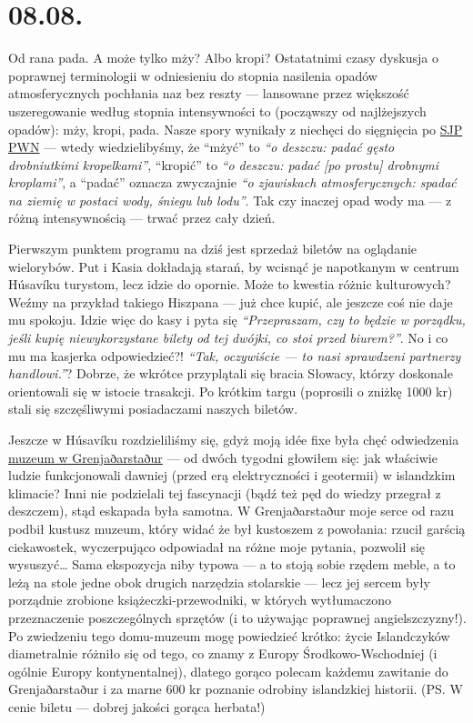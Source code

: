 \chapter*{08.08.}

Od rana pada. A może tylko mży? Albo kropi? Ostatatnimi czasy dyskusja o poprawnej terminologii w odniesieniu do stopnia nasilenia opadów atmosferycznych pochłania naz bez reszty --- lansowane przez większość uszeregowanie według stopnia intensywności to (począwszy od najlżejszych opadów): mży, kropi, pada. Nasze spory wynikały z niechęci do sięgnięcia po \href{http://sjp.pwn.pl/}{SJP PWN} --- wtedy wiedzielibyśmy, że “mżyć” to \emph{“o deszczu: padać gęsto drobniutkimi kropelkami”}, “kropić” to \emph{“o deszczu: padać [po prostu] drobnymi kroplami”}, a “padać” oznacza zwyczajnie \emph{“o zjawiskach atmosferycznych: spadać na ziemię w postaci wody, śniegu lub lodu”}. Tak czy inaczej opad wody ma --- z różną intensywnością --- trwać przez cały dzień.

Pierwszym punktem programu na dziś jest sprzedaż biletów na oglądanie wielorybów. Put i Kasia dokładają starań, by wcisnąć je napotkanym w centrum Húsavíku turystom, lecz idzie do opornie. Może to kwestia różnic kulturowych? Weźmy na przykład takiego Hiszpana --- już chce kupić, ale jeszcze coś nie daje mu spokoju. Idzie więc do kasy i pyta się \emph{“Przepraszam, czy to będzie w porządku, jeśli kupię niewykorzystane bilety od tej dwójki, co stoi przed biurem?”}. No i co mu ma kasjerka odpowiedzieć?! \emph{“Tak, oczywiście --- to nasi sprawdzeni partnerzy handlowi.”}? Dobrze, że wkrótce przyplątali się bracia Słowacy, którzy doskonale orientowali się w istocie trasakcji. Po krótkim targu (poprosili o zniżkę 1000 kr) stali się szczęśliwymi posiadaczami naszych biletów.


Jeszcze w Húsavíku rozdzieliliśmy się, gdyż moją idée fixe była chęć odwiedzenia \href{http://www.visithusavik.com/attractions/the-turf-house-museum/}{muzeum w Grenjaðarstaður} --- od dwóch tygodni głowiłem się: jak właściwie ludzie funkcjonowali dawniej (przed erą elektryczności i geotermii) w islandzkim klimacie? Inni nie podzielali tej fascynacji (bądź też pęd do wiedzy przegrał z deszczem), stąd eskapada była samotna. W Grenjaðarstaður moje serce od razu podbił kustusz muzeum, który widać że był kustoszem z powołania: rzucił garścią ciekawostek, wyczerpująco odpowiadał na różne moje pytania, pozwolił się wysuszyć… Sama ekspozycja niby typowa --- a to stoją sobie rzędem meble, a to leżą na stole jedne obok drugich narzędzia stolarskie --- lecz jej sercem były porządnie zrobione książeczki-przewodniki, w których wytłumaczono przeznaczenie poszczególnych sprzętów (i to używając poprawnej angielszczyzny!). Po zwiedzeniu tego domu-muzeum mogę powiedzieć krótko: życie Islandczyków diametralnie różniło się od tego, co znamy z Europy Środkowo-Wschodniej (i ogólnie Europy kontynentalnej), dlatego gorąco polecam każdemu zawitanie do Grenjaðarstaður i za marne 600 kr poznanie odrobiny islandzkiej historii. (PS. W cenie biletu --- dobrej jakości gorąca herbata!)

